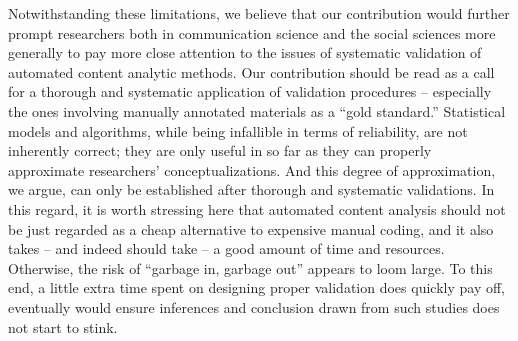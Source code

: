 \documentclass[man, floatsintext, 12pt, a4paper, noextraspace]{apa6}
\begin{document}
    Notwithstanding these limitations, we believe that our contribution would further prompt researchers both in communication science and the social sciences more generally to pay more close attention to the issues of systematic validation of automated content analytic methods. Our contribution should be read as a call for a thorough and systematic application of validation procedures -- especially the ones involving manually annotated materials as a \enquote{gold standard.} Statistical models and algorithms, while being infallible in terms of reliability, are not inherently correct; they are only useful in so far as they can properly approximate researchers' conceptualizations. And this degree of approximation, we argue, can only be established after thorough and systematic validations. In this regard, it is worth stressing here that automated content analysis should not be just regarded as a cheap alternative to expensive manual coding, and it also takes -- and indeed should take -- a good amount of time and resources. Otherwise, the risk of “garbage in, garbage out” appears to loom large. To this end, a little extra time spent on designing proper validation does quickly pay off, eventually would ensure inferences and conclusion drawn from such studies does not start to stink. 

\printbibliography
%
\end{document}
